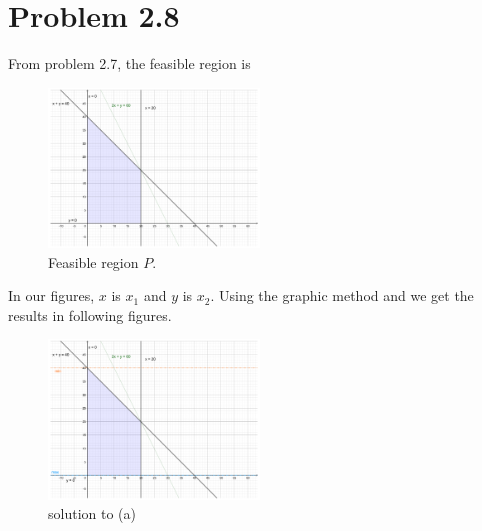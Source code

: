 \documentclass[12pt]{article}
\begin{document}
\section*{Problem 2.8}
From problem 2.7, the feasible region is 

\begin{figure}[htbp]
  \caption{Feasible region $P$.}
  \centering
    \includegraphics[width=0.5\textwidth]{2_8P.pdf}
\end{figure}

In our figures, $x$ is $x_1$ and $y$ is $x_2$. Using the graphic method and we get the results in following figures.

\begin{figure}[htbp]
  \caption{solution to (a)}
  \centering
    \includegraphics[width=0.5\textwidth]{2_8a.pdf}
\end{figure}
\end{document}
